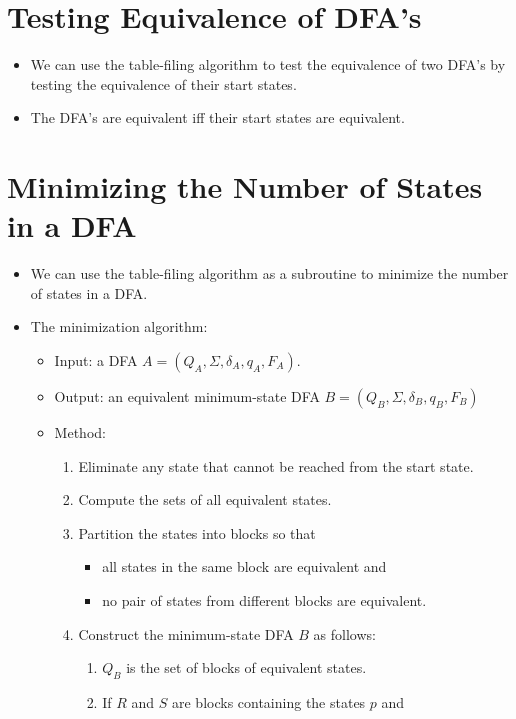 \documentclass[]{article}
\begin{document}
\section{Testing Equivalence of DFA's}
  \begin{itemize}
    \item We can use the table-filing algorithm to test the equivalence of two
    DFA's by testing the equivalence of their start states.
    \item The DFA's are equivalent iff their start states are equivalent.
  \end{itemize}

\section{Minimizing the Number of States in a DFA}
  \begin{itemize}
    \item We can use the table-filing algorithm as a subroutine to minimize the
    number of states in a DFA.
    \item The minimization algorithm:
      \begin{itemize}
        \item Input: a DFA $A = (Q_A, \Sigma, \delta_A, q_A, F_A)$.
        \item Output: an equivalent minimum-state DFA $B = (Q_B, \Sigma,
        \delta_B, q_B, F_B)$
        \item Method:
          \begin{enumerate}
            \item Eliminate any state that cannot be reached from the start
            state.
            \item Compute the sets of all equivalent states.
            \item Partition the states into blocks so that
              \begin{itemize}
                \item all states in the same block are equivalent and
                \item no pair of states from different blocks are equivalent.
              \end{itemize}
            \item Construct the minimum-state DFA $B$ as follows:
              \begin{enumerate}
                \item $Q_B$ is the set of blocks of equivalent states.
                \item If $R$ and $S$ are blocks containing the states $p$ and

\end{enumerate}
\end{enumerate}
\end{itemize}
\end{itemize}
\end{document}
